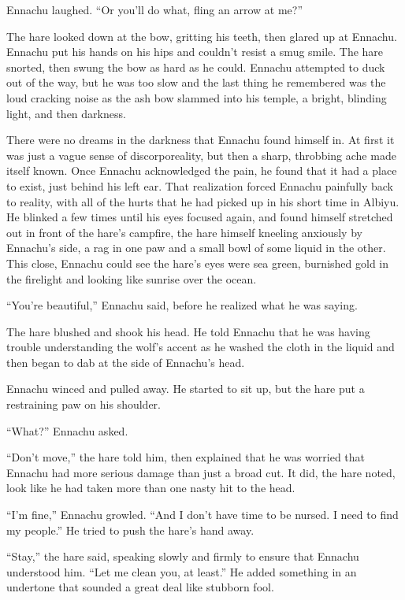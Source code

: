 Ennachu laughed. ``Or you'll do what, fling an arrow at me?''

The hare looked down at the bow, gritting his teeth, then glared up at Ennachu. Ennachu put his hands on his hips and couldn't resist a smug smile. The hare snorted, then swung the bow as hard as he could. Ennachu attempted to duck out of the way, but he was too slow and the last thing he remembered was the loud cracking noise as the ash bow slammed into his temple, a bright, blinding light, and then darkness.

There were no dreams in the darkness that Ennachu found himself in. At first it was just a vague sense of discorporeality, but then a sharp, throbbing ache made itself known. Once Ennachu acknowledged the pain, he found that it had a place to exist, just behind his left ear. That realization forced Ennachu painfully back to reality, with all of the hurts that he had picked up in his short time in Albiyu. He blinked a few times until his eyes focused again, and found himself stretched out in front of the hare's campfire, the hare himself kneeling anxiously by Ennachu's side, a rag in one paw and a small bowl of some liquid in the other. This close, Ennachu could see the hare's eyes were sea green, burnished gold in the firelight and looking like sunrise over the ocean.

``You're beautiful,'' Ennachu said, before he realized what he was saying.

The hare blushed and shook his head. He told Ennachu that he was having trouble understanding the wolf's accent as he washed the cloth in the liquid and then began to dab at the side of Ennachu's head.

Ennachu winced and pulled away. He started to sit up, but the hare put a restraining paw on his shoulder.

``What?'' Ennachu asked.

``Don't move,'' the hare told him, then explained that he was worried that Ennachu had more serious damage than just a broad cut. It did, the hare noted, look like he had taken more than one nasty hit to the head.

``I'm fine,'' Ennachu growled. ``And I don't have time to be nursed. I need to find my people.'' He tried to push the hare's hand away.

``Stay,'' the hare said, speaking slowly and firmly to ensure that Ennachu understood him. ``Let me clean you, at least.'' He added something in an undertone that sounded a great deal like stubborn fool.

